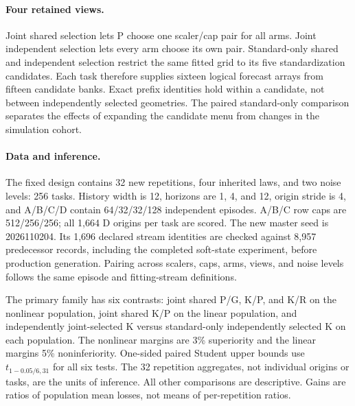 \paragraph{Four retained views.}
Joint shared selection lets P choose one scaler/cap pair for all
arms. Joint independent selection lets every arm choose its own
pair. Standard-only shared and independent selection restrict the
same fitted grid to its five standardization candidates. Each
task therefore supplies sixteen logical forecast arrays from
fifteen candidate banks. Exact prefix identities hold within a
candidate, not between independently selected geometries.
The paired standard-only comparison separates the effects of
expanding the candidate menu from changes in the simulation cohort.

\begin{table}[tbp]
\centering\small
\setlength{\tabcolsep}{4pt}

\caption{Mean SMSE in all four retained views of the joint-selection
study. The nonlinear population equally weights its three laws and
two noise conditions within each repetition; the linear population
equally weights its two noise conditions. The displayed means
average the 32 independent repetition aggregates. Each view uses
the same fresh data and the same cached candidate fits.}
\label{tab:joint-aggregate}
\end{table}

\paragraph{Data and inference.}
The fixed design contains 32 new repetitions, four inherited laws,
and two noise levels: 256 tasks. History width is 12, horizons are
1, 4, and 12, origin stride is 4, and A/B/C/D contain
64/32/32/128 independent episodes. A/B/C row caps are 512/256/256;
all 1,664 D origins per task are scored. The new master seed is
2026110204. Its 1,696 declared stream identities are checked
against 8,957 predecessor records, including the completed
soft-state experiment, before production generation. Pairing
across scalers, caps, arms, views, and noise levels follows the
same episode and fitting-stream definitions.

The primary family has six contrasts: joint shared P/G, K/P,
and K/R on the nonlinear population, joint shared K/P on the
linear population, and independently joint-selected K versus
standard-only independently selected K on each population.
The nonlinear margins are 3\% superiority and the linear
margins 5\% noninferiority. One-sided paired Student upper bounds
use $t_{1-0.05/6,31}$ for all six tests. The 32 repetition aggregates,
not individual origins or tasks, are the units of inference.
All other comparisons are descriptive. Gains are ratios of
population mean losses, not means of per-repetition ratios.

